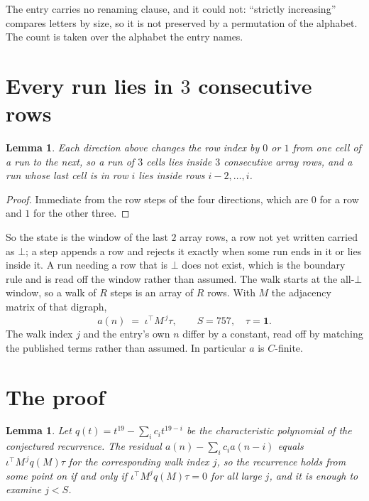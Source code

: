 \documentclass[11pt,a4paper]{article}
\theoremstyle{plain}
\newtheorem{lemma}[theorem]{Lemma}
\theoremstyle{definition}
\begin{document}
The entry carries no renaming clause, and it could not: ``strictly increasing'' compares
letters by size, so it is not preserved by a permutation of the alphabet. The count is taken
over the alphabet the entry names.

\section{Every run lies in $3$ consecutive rows}

\begin{lemma}\label{lem:win}
Each direction above changes the row index by $0$ or $1$ from one cell of a run to the next, so
a run of $3$ cells lies inside $3$ consecutive array rows, and a run whose last cell is in
row $i$ lies inside rows $i-2,\dots,i$.
\end{lemma}

\begin{proof}
Immediate from the row steps of the four directions, which are $0$ for a row and $1$ for the
other three.
\end{proof}

So the state is the window of the last $2$ array rows, a row not yet written carried as
$\bot$; a step appends a row and rejects it exactly when some run ends in it or lies inside it.
A run needing a row that is $\bot$ does not exist, which is the boundary rule and is read off
the window rather than assumed. The walk starts at the all-$\bot$ window, so a walk of $R$ steps
is an array of $R$ rows. With $M$ the adjacency matrix of that digraph,
\[
a(n)\;=\;\iota^{\!\top}M^{\,j}\tau ,\qquad S=757,\quad\tau=\mathbf{1} .
\]
The walk index $j$ and the entry's own $n$ differ by a constant, read off by matching the
published terms rather than assumed. In particular $a$ is $C$-finite.

\section{The proof}

\begin{lemma}\label{lem:crit}
Let $q(t)=t^{19}-\sum_i c_it^{19-i}$ be the characteristic polynomial of the
conjectured recurrence. The residual $a(n)-\sum_ic_ia(n-i)$ equals
$\iota^{\!\top}M^{\,j}q(M)\tau$ for the corresponding walk index $j$, so the recurrence
holds from some point on if and only if $\iota^{\!\top}M^{j}q(M)\tau=0$ for all large $j$,
and it is enough to examine $j<S$.
\end{lemma}
\end{document}
